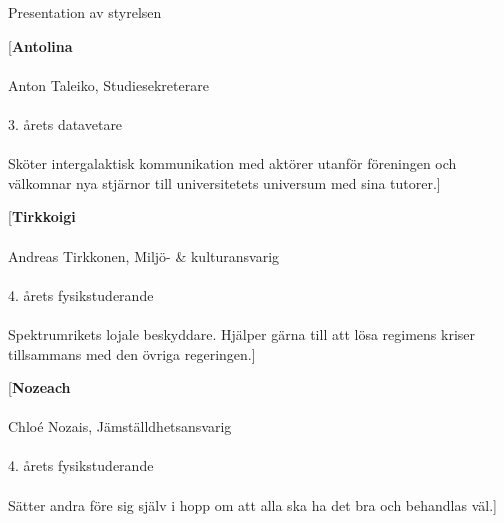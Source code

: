 \documentclass{spektraklet}
\begin{document}
\begin{artikel}{Presentation av styrelsen}{}
\begin{twocolumns}
\columnbreak

[\textbf{Antolina} \\ \\ Anton Taleiko, Studiesekreterare \\ \\ 3. årets datavetare \\ \\ Sköter intergalaktisk kommunikation med aktörer utanför föreningen och välkomnar nya stjärnor till universitetets universum med sina tutorer.]

\columnbreak

[\textbf{Tirkkoigi} \\ \\ Andreas Tirkkonen, Miljö- \& kulturansvarig \\ \\ 4. årets fysikstuderande \\ \\ Spektrumrikets lojale beskyddare. Hjälper gärna till att lösa regimens kriser tillsammans med den övriga regeringen.]

\columnbreak

[\textbf{Nozeach} \\ \\ Chloé Nozais, Jämställdhetsansvarig \\ \\ 4. årets fysikstuderande \\ \\ Sätter andra före sig själv i hopp om att alla ska ha det bra och behandlas väl.]

\end{twocolumns}
\end{artikel}
\end{document}
